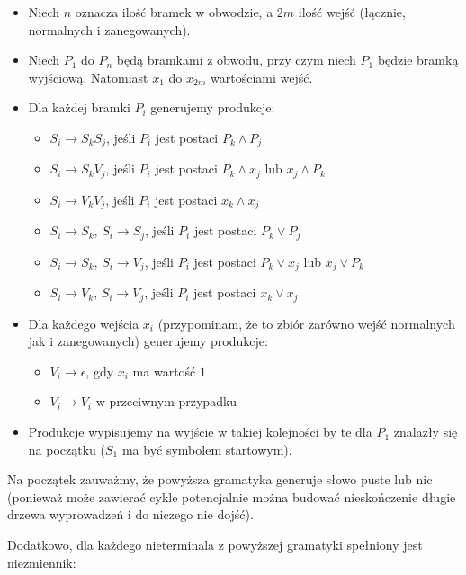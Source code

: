 \documentclass[a4paper,11pt]{article}
\begin{document}
\begin{itemize}
  \item{Niech $n$ oznacza ilość bramek w obwodzie, a $2m$ ilość wejść (łącznie,
        normalnych i zanegowanych).}
  \item{Niech $P_{1}$ do $P_{n}$ będą bramkami z obwodu, przy czym niech $P_{1}$
        będzie bramką wyjściową. Natomiast $x_1$ do $x_{2m}$ wartościami wejść.}
  \item{Dla każdej bramki $P_i$ generujemy produkcje:
    \begin{itemize}
      \item{$S_i \rightarrow S_k S_j$, jeśli $P_i$ jest postaci $P_k \wedge P_j$}
      \item{$S_i \rightarrow S_k V_j$, jeśli $P_i$ jest postaci $P_k \wedge x_j$
            lub $x_j \wedge P_k$}
      \item{$S_i \rightarrow V_k V_j$, jeśli $P_i$ jest postaci $x_k \wedge x_j$}

      \item{$S_i \rightarrow S_k$, $S_i \rightarrow S_j$, jeśli $P_i$ jest postaci $P_k \vee P_j$}
      \item{$S_i \rightarrow S_k$, $S_i \rightarrow V_j$, jeśli $P_i$ jest postaci $P_k \vee x_j$
            lub $x_j \vee P_k$}
      \item{$S_i \rightarrow V_k$, $S_i \rightarrow V_j$, jeśli $P_i$ jest postaci $x_k \vee x_j$}
    \end{itemize}
  }
  \item{Dla każdego wejścia $x_i$ (przypominam, że to zbiór zarówno wejść
        normalnych jak i zanegowanych) generujemy produkcje:
    \begin{itemize}
      \item{$V_i \rightarrow \epsilon $, gdy $x_i$ ma wartość $1$}
      \item{$V_i \rightarrow V_i$ w przeciwnym przypadku}
    \end{itemize}
  }
  \item{Produkcje wypisujemy na wyjście w takiej kolejności by te dla $P_{1}$
        znalazły się na początku ($S_{1}$ ma być symbolem startowym).}
\end{itemize}


Na początek zauważmy, że powyższa gramatyka generuje słowo puste lub nic
(ponieważ może zawierać cykle potencjalnie można budować nieskończenie długie
drzewa wyprowadzeń i do niczego nie dojść).

Dodatkowo, dla każdego nieterminala z powyższej gramatyki spełniony jest
niezmiennik:
\end{document}
